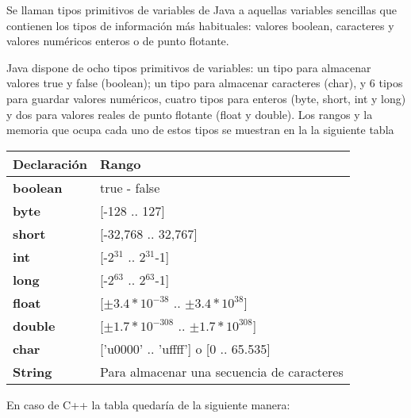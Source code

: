 Se llaman tipos primitivos de variables de Java a aquellas variables sencillas que contienen los tipos
de información más habituales: valores boolean, caracteres y valores numéricos enteros o de punto
flotante.

Java dispone de ocho tipos primitivos de variables: un tipo para almacenar valores true y
false (boolean); un tipo para almacenar caracteres (char), y 6 tipos para guardar valores numéricos,
cuatro tipos para enteros (byte, short, int y long) y dos para valores reales de punto flotante (float y
double). Los rangos y la memoria que ocupa cada uno de estos tipos se muestran en la la siguiente tabla

\begin{tabular}{|p{2.5cm}|p{12.3cm}|}
	\hline 
	\textbf{Declaración}  & \textbf{Rango}  \\ 
	\hline 
	\textbf{boolean} & true - false   \\ 
	\hline	
	\textbf{byte} & [-128 .. 127]   \\ 
	\hline 
	\textbf{short} & [-32,768 .. 32,767]  \\ 
	\hline 
	\textbf{int} & [-2$^{31}$ .. 2$^{31}$-1]   \\ 
	\hline	
	\textbf{long} & [-2$^{63}$ .. 2$^{63}$-1]    \\ 
	\hline	
	\textbf{float} & [$\pm3.4*10^{-38}$ .. $\pm3.4*10^{38}$]   \\ 
	\hline	
	\textbf{double} & [$\pm1.7*10^{-308}$ .. $\pm1.7*10^{308}$]  \\ 
	\hline	
	\textbf{char} & ['u0000' .. 'uffff'] o [0 .. 65.535]  \\ 
	\hline
	\textbf{String} & Para almacenar una secuencia de caracteres  \\ 
	\hline	
\end{tabular}

En caso de C++ la tabla quedaría de la siguiente manera:

